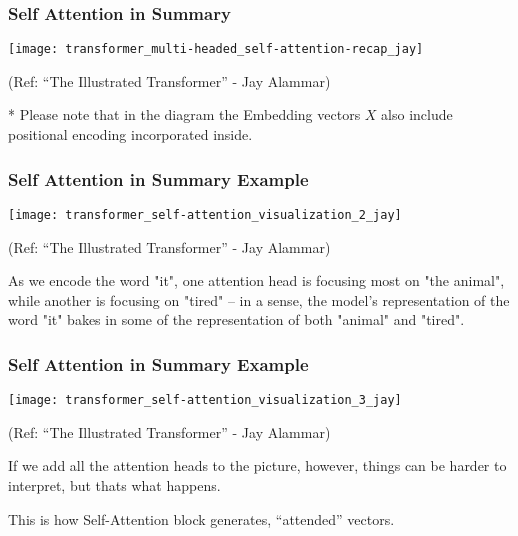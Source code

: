 \begin{frame}[fragile]\frametitle{Self Attention in Summary}


\begin{center}
\texttt{[image: transformer\_multi-headed\_self-attention-recap\_jay]}


{\tiny (Ref: ``The Illustrated Transformer'' - Jay Alammar)}
\end{center}	


* Please note that in the diagram the Embedding vectors $X$ also include positional encoding incorporated inside.	

\end{frame}


\begin{frame}[fragile]\frametitle{Self Attention in Summary Example}


\begin{center}
\texttt{[image: transformer\_self-attention\_visualization\_2\_jay]}


{\tiny (Ref: ``The Illustrated Transformer'' - Jay Alammar)}
\end{center}	


As we encode the word "it", one attention head is focusing most on "the animal", while another is focusing on "tired" -- in a sense, the model's representation of the word "it" bakes in some of the representation of both "animal" and "tired".

\end{frame}

\begin{frame}[fragile]\frametitle{Self Attention in Summary Example}



\begin{center}
\texttt{[image: transformer\_self-attention\_visualization\_3\_jay]}


{\tiny (Ref: ``The Illustrated Transformer'' - Jay Alammar)}
\end{center}	

If we add all the attention heads to the picture, however, things can be harder to interpret, but thats what happens.

This is how Self-Attention block generates, ``attended'' vectors.

\end{frame}

